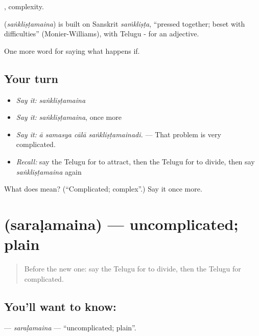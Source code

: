 , complexity.

\begin{cousinweb}
\textbf{} (\emph{saṅkliṣṭamaina}) is built on Sanskrit \emph{saṁkliṣṭa}, \textquotedblleft{}pressed together; beset with difficulties\textquotedblright{} (Monier-Williams), with Telugu - for an adjective.
\end{cousinweb}

\begin{grammarlens}[title={What you've built}]
One more word for saying what happens if.
\end{grammarlens}

\subsection*{Your turn}
\begin{itemize}
\raggedright
  \item \emph{Say it:} \emph{saṅkliṣṭamaina}
  \item \emph{Say it:} \emph{saṅkliṣṭamaina}, once more
  \item \emph{Say it:} \emph{ā samasya cālā saṅkliṣṭamainadi.} — That problem is very complicated.
  \item \emph{Recall:} say the Telugu for to attract, then the Telugu for to divide, then say \emph{saṅkliṣṭamaina} again
\end{itemize}

\begin{tcolorbox}[breakable,colback=teal!4,colframe=teal!35!black,title={Before you move on}]
What does  mean? (\textquotedblleft{}Complicated; complex\textquotedblright{}.) Say it once more.
\end{tcolorbox}
\section[\texorpdfstring{\te{సరళమైన} (saraḷamaina)}{సరళమైన (saraḷamaina)}]{ (saraḷamaina) — uncomplicated; plain}

\label{lesson:TE-C437-saralamaina}



\begin{quote}
Before the new one: say the Telugu for to divide, then the Telugu for complicated.
\end{quote}

\subsection*{You'll want to know: }
\textbf{} — \emph{saraḷamaina} — \textquotedblleft{}uncomplicated; plain\textquotedblright{}.

